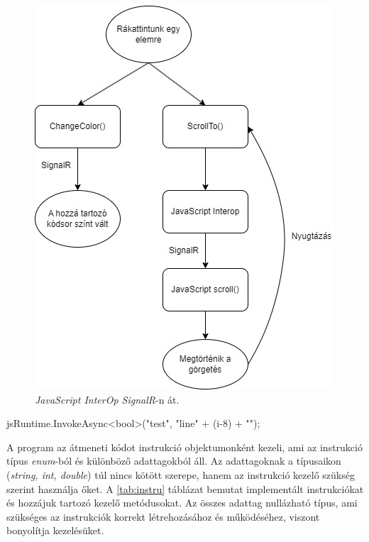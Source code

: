 \begin{figure}[h]
\centering
\includegraphics[scale=0.85]{images/JSpl.jpg}
\caption{\textit{JavaScript InterOp SignalR}-n át.}
\label{fig:jspl}
\end{figure}

\begin{cpp}
jsRuntime.InvokeAsync<bool>("test", "line{" + (i-8) + "}");
\end{cpp}

\newpage

A program az átmeneti kódot instrukció objektumonként kezeli, ami az instrukció típus \textit{enum}-ból és különböző adattagokból áll. Az adattagoknak a típusaikon (\textit{string, int, double}) túl nincs kötött szerepe, hanem az instrukció kezelő szükség szerint használja őket. A \ref{tab:instru} táblázat bemutat implementált instrukciókat és hozzájuk tartozó kezelő metódusokat. Az összes adattag nullázható típus, ami szükséges az instrukciók korrekt létrehozásához és működéséhez, viszont bonyolítja kezelésüket.

